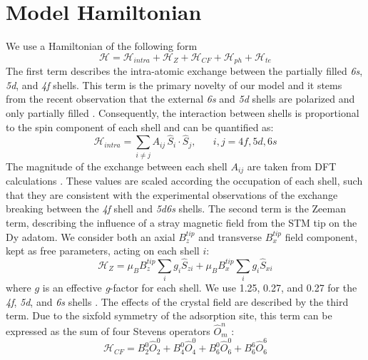 \documentclass[reprint,amsmath,amssymb,aps,nofootinbib,onecolumn]{revtex4-2}
\begin{document}
\section{Model Hamiltonian}
We use a Hamiltonian of the following form
\begin{equation}
\mathcal{H} = \mathcal{H}_{intra} + \mathcal{H}_{Z} + \mathcal{H}_{CF}  + \mathcal{H}_{ph} + \mathcal{H}_{te}
\end{equation}
The first term describes the intra-atomic exchange between the partially filled \textit{6s}, \textit{5d}, and \textit{4f} shells. This term is the primary novelty of our model and it stems from the recent observation that the external \textit{6s} and \textit{5d} shells are polarized and only partially filled \cite{pivettaMeasuringIntraAtomicExchange2020}. Consequently, the interaction between shells is proportional to the spin component of each shell and can be quantified as:
\begin{equation}
\mathcal{H}_{intra} =\sum_{i\neq j} A_{ij} \, \hat{S}_{i} \cdot \hat{S}_{j} , \;\;\;\;\;\; i,j = 4f, 5d, 6s
\end{equation}
The magnitude of the exchange between each shell $A_{ij}$ are taken from DFT calculations \cite{Delin1997,pivettaMeasuringIntraAtomicExchange2020}. These values are scaled according the occupation of each shell, such that they are consistent with the experimental observations of the exchange breaking between the \textit{4f} shell and \textit{5d6s} shells. The second term is the Zeeman term, describing the influence of a stray magnetic field from the STM tip on the Dy adatom. We consider both an axial $B^{tip}_z$ and transverse $B^{tip}_x$ field component, kept as free parameters, acting on each shell $i$:
\begin{equation}
\mathcal{H}_{Z} = \mu_{B} B^{tip}_z  \sum_{i} g_{i} \hat{S}_{zi} + \mu_{B} B^{tip}_x  \sum_{i} g_{i} \hat{S}_{xi}
\label{eq:zeeman}
\end{equation}
where $g$ is an effective \textit{g}-factor for each shell. We use 1.25, 0.27, and 0.27 for the \textit{4f}, \textit{5d}, and \textit{6s} shells \cite{pivettaMeasuringIntraAtomicExchange2020}. The effects of the crystal field are described by the third term. Due to the sixfold symmetry of the adsorption site, this term can be expressed as the sum of four Stevens operators $\hat{O}^{n}_{m}$ \cite{baltic2016, Stevens_1952}:
\begin{equation}
\mathcal{H}_{CF} = B^{0}_{2} \hat{O}^{0}_{2} + B^{0}_{4} \hat{O}^{0}_{4} + B^{0}_{6} \hat{O}^{0}_{6} + B^{6}_{6} \hat{O}^{6}_{6}
\end{equation}
\end{document}

